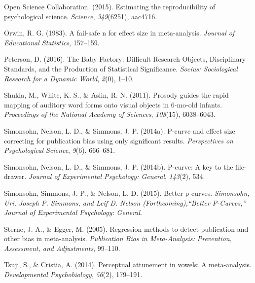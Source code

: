 \documentclass[english,floatsintext,man]{apa6}
\begin{document}
\hypertarget{ref-open2015estimating}{}
Open Science Collaboration. (2015). Estimating the reproducibility of
psychological science. \emph{Science}, \emph{349}(6251), aac4716.

\hypertarget{ref-orwin1983fail}{}
Orwin, R. G. (1983). A fail-safe n for effect size in meta-analysis.
\emph{Journal of Educational Statistics}, 157--159.

\hypertarget{ref-Peterson:2016}{}
Peterson, D. (2016). The Baby Factory: Difficult Research Objects,
Disciplinary Standards, and the Production of Statistical Significance.
\emph{Socius: Sociological Research for a Dynamic World}, \emph{2}(0),
1--10.

\hypertarget{ref-shukla2011prosody}{}
Shukla, M., White, K. S., \& Aslin, R. N. (2011). Prosody guides the
rapid mapping of auditory word forms onto visual objects in 6-mo-old
infants. \emph{Proceedings of the National Academy of Sciences},
\emph{108}(15), 6038--6043.

\hypertarget{ref-simonsohn2014power}{}
Simonsohn, Nelson, L. D., \& Simmons, J. P. (2014a). P-curve and effect
size correcting for publication bias using only significant results.
\emph{Perspectives on Psychological Science}, \emph{9}(6), 666--681.

\hypertarget{ref-simonsohn2014p}{}
Simonsohn, Nelson, L. D., \& Simmons, J. P. (2014b). P-curve: A key to
the file-drawer. \emph{Journal of Experimental Psychology: General},
\emph{143}(2), 534.

\hypertarget{ref-simonsohn2015better}{}
Simonsohn, Simmons, J. P., \& Nelson, L. D. (2015). Better p-curves.
\emph{Simonsohn, Uri, Joseph P. Simmons, and Leif D. Nelson
(Forthcoming),``Better P-Curves,'' Journal of Experimental Psychology:
General}.

\hypertarget{ref-sterne2005regression}{}
Sterne, J. A., \& Egger, M. (2005). Regression methods to detect
publication and other bias in meta-analysis. \emph{Publication Bias in
Meta-Analysis: Prevention, Assessment, and Adjustments}, 99--110.

\hypertarget{ref-tsuji2014perceptual}{}
Tsuji, S., \& Cristia, A. (2014). Perceptual attunement in vowels: A
meta-analysis. \emph{Developmental Psychobiology}, \emph{56}(2),
179--191.
\end{document}

